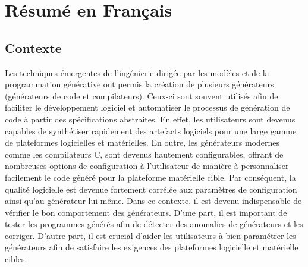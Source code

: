 \chapter*{R\'esum\'e en Fran\c{c}ais}
\section*{Contexte}
Les techniques \'emergentes de l'ing\'enierie dirig\'ee par les mod\`eles et de la programmation g\'en\'erative ont permis la cr\'eation de plusieurs g\'en\'erateurs (g\'en\'erateurs de code et compilateurs). Ceux-ci sont souvent utilis\'es afin de faciliter le d\'eveloppement logiciel et automatiser le processus de g\'en\'eration de code \`a partir des sp\'ecifications abstraites. En effet, les utilisateurs sont devenus capables de synth\'etiser rapidement des artefacts logiciels pour une large gamme de plateformes logicielles et mat\'erielles. En outre, les g\'en\'erateurs modernes comme les compilateurs C, sont devenus hautement configurables, offrant de nombreuses options de configuration \`a l'utilisateur de mani\`ere \`a personnaliser facilement le code g\'en\'er\'e pour la plateforme mat\'erielle cible. Par cons\'equent, la qualit\'e logicielle est devenue fortement corr\'el\'ee aux param\`etres de configuration ainsi qu'au g\'en\'erateur lui-m\^eme. Dans ce contexte, il est devenu indispensable de v\'erifier le bon comportement des g\'en\'erateurs. D'une part, il est important de tester les programmes g\'en\'er\'es afin de d\'etecter des anomalies de g\'en\'erateurs et les corriger. D'autre part, il est crucial d'aider les utilisateurs \`a bien param\'etrer les g\'en\'erateurs afin de satisfaire les exigences des plateformes logicielle et mat\'erielle cibles. 


